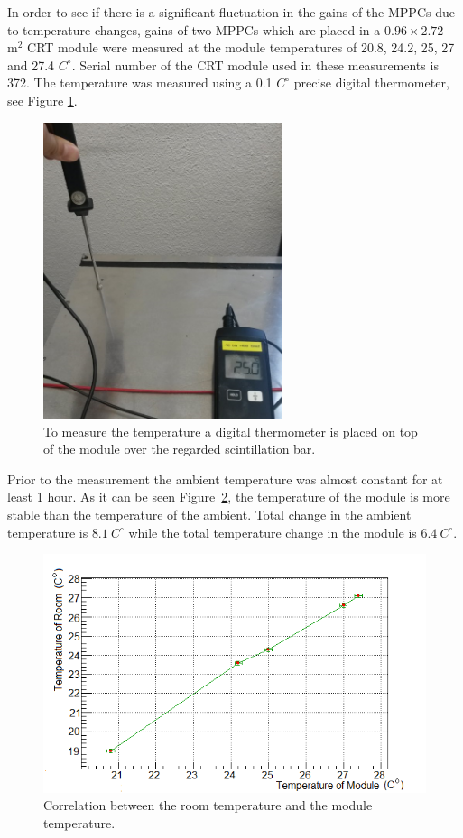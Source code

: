 \documentclass[a4paper]{article}\linespread{1.4}
\begin{document}
In order to see if there is a significant fluctuation in the gains of the MPPCs due to temperature changes, gains of two MPPCs which are placed in a $0.96 \times 2.72$ $\mathrm{m^{2}}$ CRT module were measured at the module temperatures of 20.8, 24.2, 25, 27 and 27.4 $C^{\circ}$. Serial number of the CRT module used in these measurements is 372.
The temperature was measured using a 0.1 $C^{\circ}$ precise digital thermometer, see Figure \ref{fig:term}.
\begin{figure}[] \centering \includegraphics[width=70mm,scale=1.0]{termpaint.png} \caption{To measure the temperature a digital thermometer is placed on top of the module over the regarded scintillation bar.} \label{fig:term} \end{figure}  
Prior to the measurement the ambient temperature was almost constant for at least 1 hour. As it can be seen Figure~\ref{fig:rvsm}, the temperature of the module is more stable than the temperature of the ambient. 
Total change in the ambient temperature is $8.1~C^{\circ}$ while the total temperature change in the module is $6.4~C^{\circ}$.
\begin{figure}[] \centering \includegraphics[width=130mm,scale=1.0]{mea.png} \caption{Correlation between the room temperature and the module temperature.} \label{fig:rvsm} \end{figure}  
\end{document}
